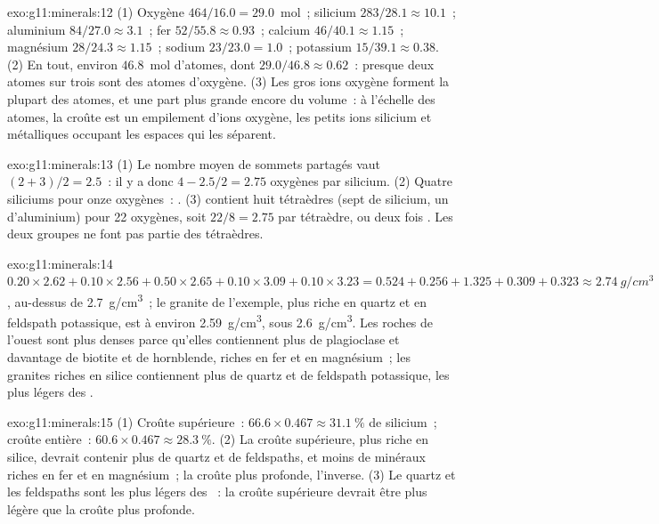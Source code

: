 \begin{solution}{exo:g11:minerals:12}
(1) Oxygène $464/16.0 = 29.0$~mol~; silicium $283/28.1 \approx 10.1$~;
aluminium $84/27.0 \approx 3.1$~; fer $52/55.8 \approx 0.93$~; calcium
$46/40.1 \approx
1.15$~; magnésium $28/24.3 \approx 1.15$~; sodium $23/23.0 = 1.0$~;
potassium $15/39.1 \approx 0.38$. (2) En tout, environ $46.8$~mol
d'atomes, dont
$29.0/46.8 \approx 0.62$~: presque deux atomes sur trois sont des atomes
d'oxygène. (3) Les gros ions oxygène forment la plupart des atomes, et une
part plus grande encore du volume~: à l'échelle des atomes, la croûte est un
empilement d'ions oxygène, les petits ions silicium et métalliques occupant
les espaces qui les séparent.
\end{solution}

\begin{solution}{exo:g11:minerals:13}
(1) Le nombre moyen de sommets partagés vaut $(2 + 3)/2 = 2.5$~: il y a donc
$4 - 2.5/2 = 2.75$ oxygènes par silicium. (2) Quatre siliciums pour onze
oxygènes~: . (3)  contient huit tétraèdres (sept de
silicium, un d'aluminium) pour 22 oxygènes, soit $22/8 = 2.75$ par
tétraèdre, ou deux fois . Les deux groupes  ne font pas
partie des tétraèdres.
\end{solution}

\begin{solution}{exo:g11:minerals:14}
$0.20 \times 2.62 + 0.10 \times 2.56 + 0.50 \times 2.65 + 0.10 \times 3.09 +
0.10 \times 3.23 = 0.524 + 0.256 + 1.325 + 0.309 + 0.323 \approx
\qty{2.74}{g/cm^3}$, au-dessus de \qty{2.7}{g/cm^3}~; le granite de
l'exemple, plus riche en quartz et en feldspath potassique, est à environ
\qty{2.59}{g/cm^3}, sous \qty{2.6}{g/cm^3}. Les roches de l'ouest sont plus
denses parce qu'elles contiennent plus de plagioclase et davantage de
biotite et de hornblende, riches en fer et en magnésium~; les granites
riches en silice contiennent plus de quartz et de feldspath potassique, les
plus légers des .
\end{solution}

\begin{solution}{exo:g11:minerals:15}
(1) Croûte supérieure~: $66.6 \times 0.467 \approx \qty{31.1}{\percent}$ de
silicium~; croûte entière~: $60.6 \times 0.467 \approx \qty{28.3}{\percent}$.
(2) La croûte supérieure, plus riche en silice, devrait contenir plus de
quartz et de feldspaths, et moins de minéraux riches en fer et en
magnésium~; la croûte plus profonde, l'inverse. (3) Le quartz et les
feldspaths sont les plus légers des ~: la
croûte supérieure devrait être plus légère que la croûte plus profonde.
\end{solution}

